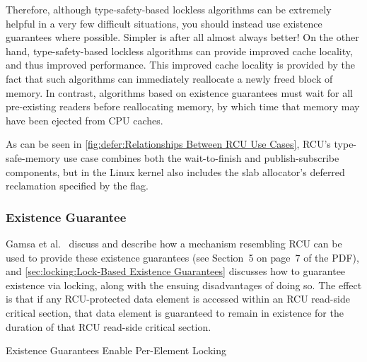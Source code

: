 Therefore, although type-safety-based lockless algorithms can be extremely
helpful in a very few difficult situations, you should instead use existence
guarantees where possible.
Simpler is after all almost always better!
On the other hand, type-safety-based lockless algorithms can
provide improved cache locality, and thus improved performance.
This improved cache locality is provided by the fact that such
algorithms can immediately reallocate a newly freed block of memory.
In contrast, algorithms based on existence guarantees must wait for
all pre-existing readers before reallocating memory, by which time
that memory may have been ejected from CPU caches.

As can be seen in \cref{fig:defer:Relationships Between RCU Use Cases},
RCU's type-safe-memory use case combines both the wait-to-finish
and publish-subscribe components, but in the Linux kernel also includes
the slab allocator's deferred reclamation specified by the
 flag.

\subsubsection{Existence Guarantee}
\label{sec:defer:Existence Guarantee}

Gamsa et al.~\cite{Gamsa99}
discuss  and describe how a mechanism
resembling RCU can be used to provide these existence guarantees
(see Section~5 on page~7 of the PDF), and
\cref{sec:locking:Lock-Based Existence Guarantees}
discusses how to guarantee existence via locking, along with the
ensuing disadvantages of doing so.
The effect is that if any RCU-protected data element is accessed
within an RCU read-side critical section, that data element is
guaranteed to remain in existence for the duration of that RCU
read-side critical section.

\begin{listing}
\begin{fcvlabel}
\end{fcvlabel}
\caption{Existence Guarantees Enable Per-Element Locking}
\label{lst:defer:Existence Guarantees Enable Per-Element Locking}
\end{listing}

